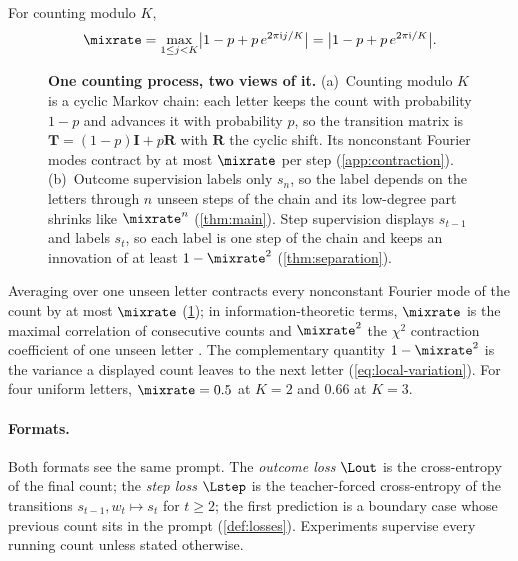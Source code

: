 \begin{definition}
\label{def:lambda}
For counting modulo $K$,
\begin{equation}
 \mixrate=\max_{1\le j<K}\bigl|1-p+p\,e^{2\pi\mathrm ij/K}\bigr|=\bigl|1-p+p\,e^{2\pi\mathrm i/K}\bigr|.
 \label{eq:lambda}
\end{equation}
\end{definition}

\begin{figure}[t]
\centering
\resizebox{\linewidth}{!}{}
\caption{\textbf{One counting process, two views of it.}
(a)~Counting modulo $K$ is a cyclic Markov chain: each letter keeps the count with probability $1-p$ and advances it with probability
$p$, so the transition matrix is $\mathbf T=(1-p)\mathbf I+p\mathbf R$ with $\mathbf R$ the cyclic shift. Its nonconstant Fourier modes
contract by at most $\mixrate$ per step (\cref{app:contraction}).
(b)~Outcome supervision labels only $s_n$, so the label depends on the letters through $n$ unseen steps of the chain and its
low-degree part shrinks like $\mixrate^n$ (\cref{thm:main}). Step supervision displays $s_{t-1}$ and labels $s_t$, so each label is one
step of the chain and keeps an innovation of at least $1-\mixrate^2$ (\cref{thm:separation}).}
\label{fig:chain}
\end{figure}

Averaging over one unseen letter contracts every nonconstant Fourier mode of the count by at most $\mixrate$ (\cref{fig:chain}); in information-theoretic terms,
$\mixrate$ is the maximal correlation of consecutive counts and $\mixrate^2$ the $\chi^2$ contraction coefficient of one
unseen letter \citep{witsenhausen1975sequences,raginsky2016strong}. The complementary quantity $1-\mixrate^2$ is the
variance a displayed count leaves to the next letter (\cref{eq:local-variation}). For four uniform letters,
$\mixrate=0.5$ at $K=2$ and $0.66$ at $K=3$.

\paragraph{Formats.} Both formats see the same prompt. The \emph{outcome loss} $\Lout$ is the cross-entropy of the final
count; the \emph{step loss} $\Lstep$ is the teacher-forced cross-entropy of the transitions $s_{t-1},w_t\mapsto s_t$ for
$t\ge2$; the first prediction is a boundary case whose previous count sits in the prompt (\cref{def:losses}). Experiments
supervise every running count unless stated otherwise.

